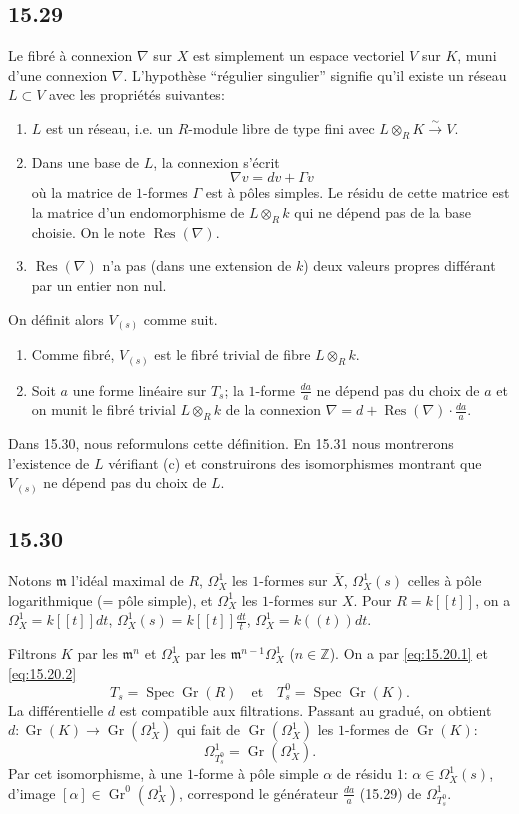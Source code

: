 \documentclass[12pt,a4paper]{article}
\theoremstyle{plain}
\theoremstyle{definition}
\theoremstyle{remark}
\DeclareMathOperator{\Spec}{Spec}
\DeclareMathOperator{\Gr}{Gr}
\DeclareMathOperator{\Res}{Res}
\newcommand{\bZ}{\mathbb{Z}}
\begin{document}
\subsection*{15.29}

Le fibré à connexion $\nabla$ sur $X$ est simplement un espace vectoriel $V$ sur $K$, muni d'une connexion $\nabla$. L'hypothèse ``régulier singulier'' signifie qu'il existe un réseau $L \subset V$ avec les propriétés suivantes:
\begin{enumerate}[label=(\alph*), nosep]
\item $L$ est un réseau, i.e. un $R$-module libre de type fini avec $L \otimes_R K \xrightarrow{\sim} V$.
\item Dans une base de $L$, la connexion s'écrit
\[
\nabla v = dv + \Gamma v
\]
où la matrice de $1$-formes $\Gamma$ est à pôles simples. Le résidu de cette matrice est la matrice d'un endomorphisme de $L \otimes_R k$ qui ne dépend pas de la base choisie. On le note $\Res(\nabla)$.
\item $\Res(\nabla)$ n'a pas (dans une extension de $k$) deux valeurs propres différant par un entier non nul.
\end{enumerate}
On définit alors $V_{(s)}$ comme suit.
\begin{enumerate}[label=(\arabic*), nosep]
\item Comme fibré, $V_{(s)}$ est le fibré trivial de fibre $L \otimes_R k$.
\item Soit $a$ une forme linéaire sur $T_s$; la $1$-forme $\frac{da}{a}$ ne dépend pas du choix de $a$ et on munit le fibré trivial $L \otimes_R k$ de la connexion $\nabla = d + \Res(\nabla) \cdot \frac{da}{a}$.
\end{enumerate}

Dans 15.30, nous reformulons cette définition. En 15.31 nous montrerons l'existence de $L$ vérifiant (c) et construirons des isomorphismes montrant que $V_{(s)}$ ne dépend pas du choix de $L$.

\subsection*{15.30}

Notons $\mathfrak{m}$ l'idéal maximal de $R$, $\Omega_X^1$ les $1$-formes sur $\overline{X}$, $\Omega_X^1(s)$ celles à pôle logarithmique (= pôle simple), et $\Omega_X^1$ les $1$-formes sur $X$. Pour $R = k[[t]]$, on a $\Omega_X^1 = k[[t]]dt$, $\Omega_X^1(s) = k[[t]]\frac{dt}{t}$, $\Omega_X^1 = k((t))dt$.

Filtrons $K$ par les $\mathfrak{m}^n$ et $\Omega_X^1$ par les $\mathfrak{m}^{n-1}\Omega_X^1$ ($n \in \bZ$). On a par \eqref{eq:15.20.1} et \eqref{eq:15.20.2}
\[
T_s = \Spec \Gr(R) \quad \text{et} \quad T_s^0 = \Spec \Gr(K).
\]
La différentielle $d$ est compatible aux filtrations. Passant au gradué, on obtient $d: \Gr(K) \to \Gr(\Omega_X^1)$ qui fait de $\Gr(\Omega_X^1)$ les $1$-formes de $\Gr(K)$:
\[
\Omega_{T_s^0}^1 = \Gr(\Omega_X^1).
\]
Par cet isomorphisme, à une $1$-forme à pôle simple $\alpha$ de résidu $1$: $\alpha \in \Omega_X^1(s)$, d'image $[\alpha] \in \Gr^0(\Omega_X^1)$, correspond le générateur $\frac{da}{a}$ (15.29) de $\Omega_{T_s^0}^1$.
\end{document}
